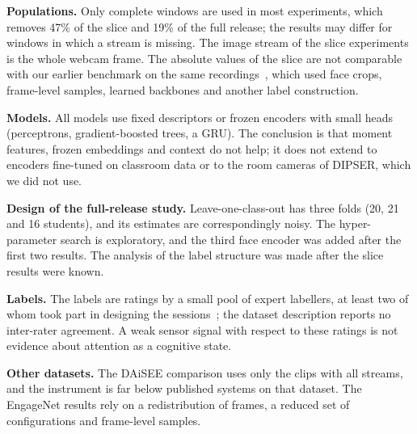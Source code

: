 \textbf{Populations.} Only complete windows are used in most experiments, which removes 47\% of the slice and 19\% of the full release; the results may differ for windows in which a stream is missing. The image stream of the slice experiments is the whole webcam frame. The absolute values of the slice are not comparable with our earlier benchmark on the same recordings~\cite{makhkhas2026ordinal}, which used face crops, frame-level samples, learned backbones and another label construction.

\textbf{Models.} All models use fixed descriptors or frozen encoders with small heads (perceptrons, gradient-boosted trees, a GRU). The conclusion is that moment features, frozen embeddings and context do not help; it does not extend to encoders fine-tuned on classroom data or to the room cameras of DIPSER, which we did not use.

\textbf{Design of the full-release study.} Leave-one-class-out has three folds (20, 21 and 16 students), and its estimates are correspondingly noisy. The hyper-parameter search is exploratory, and the third face encoder was added after the first two results. The analysis of the label structure was made after the slice results were known.

\textbf{Labels.} The labels are ratings by a small pool of expert labellers, at least two of whom took part in designing the sessions~\cite{marquezcarpintero2025dipser}; the dataset description reports no inter-rater agreement. A weak sensor signal with respect to these ratings is not evidence about attention as a cognitive state.

\textbf{Other datasets.} The DAiSEE comparison uses only the clips with all streams, and the instrument is far below published systems on that dataset. The EngageNet results rely on a redistribution of frames, a reduced set of configurations and frame-level samples.
